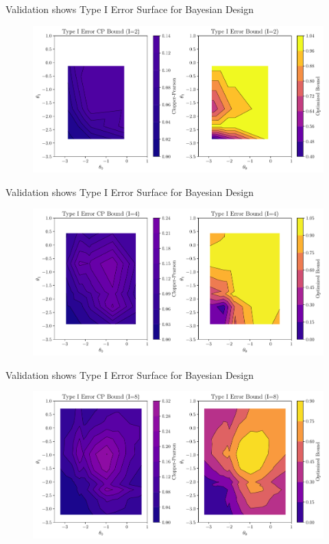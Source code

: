 \begin{frame}{Validation shows Type I Error Surface for Bayesian Design}
\begin{figure}
    \centering
    \includegraphics[width=\linewidth]{figs/berry_0.pdf}
\end{figure}
\end{frame}

\begin{frame}{Validation shows Type I Error Surface for Bayesian Design}
\begin{figure}
    \centering
    \includegraphics[width=\linewidth]{figs/berry_1.pdf}
\end{figure}
\end{frame}

\begin{frame}{Validation shows Type I Error Surface for Bayesian Design}
\begin{figure}
    \centering
    \includegraphics[width=\linewidth]{figs/berry_2.pdf}
\end{figure}
\end{frame}

